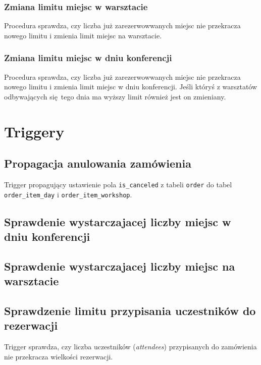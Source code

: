 \documentclass[12pt]{article}
\begin{document}


\subsubsection{Zmiana limitu miejsc w warsztacie}
Procedura sprawdza, czy liczba już zarezerwowwanych miejsc nie przekracza nowego limitu i zmienia limit miejsc na warsztacie.


\subsubsection{Zmiana limitu miejsc w dniu konferencji}
Procedura sprawdza, czy liczba już zarezerwowwanych miejsc nie przekracza nowego limitu i zmienia limit miejsc w dniu konferencji. Jeśli któryś z warsztatów odbywających się tego dnia ma wyższy limit również jest on zmieniany.




\section{Triggery}


\subsection{Propagacja anulowania zamówienia}
Trigger propagujący ustawienie pola \texttt{is\_canceled} z tabeli \texttt{order} do tabel \texttt{order\_item\_day} i \texttt{order\_item\_workshop}.



\subsection{Sprawdenie wystarczajacej liczby miejsc w dniu konferencji}


\subsection{Sprawdenie wystarczajacej liczby miejsc na warsztacie}


\subsection{Sprawdzenie limitu przypisania uczestników do rezerwacji}
Trigger sprawdza, czy liczba uczestników (\textit{attendees}) przypisanych do zamówienia nie przekracza wielkości rezerwacji.
\end{document}
